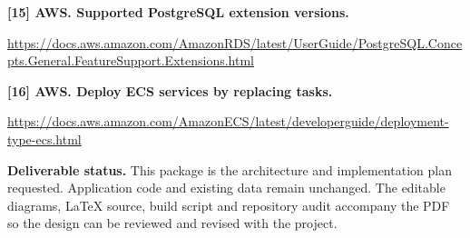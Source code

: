 \documentclass[10pt,letterpaper]{article}
\newcommand{\key}[1]{\textbf{\color{ink}#1}}
\newenvironment{decision}{\begin{tcolorbox}[colback=pale,colframe=teal,boxrule=0.5pt,arc=2pt,left=9pt,right=9pt,top=6pt,bottom=6pt]}{\end{tcolorbox}}
\begin{document}
\hypertarget{src15}{}\key{[15] AWS. Supported PostgreSQL extension versions.}\par
\url{https://docs.aws.amazon.com/AmazonRDS/latest/UserGuide/PostgreSQL.Concepts.General.FeatureSupport.Extensions.html}

\hypertarget{src16}{}\key{[16] AWS. Deploy ECS services by replacing tasks.}\par
\url{https://docs.aws.amazon.com/AmazonECS/latest/developerguide/deployment-type-ecs.html}

\vfill
\begin{decision}
\key{Deliverable status.} This package is the architecture and implementation plan requested. Application code and existing data remain unchanged. The editable diagrams, LaTeX source, build script and repository audit accompany the PDF so the design can be reviewed and revised with the project.
\end{decision}
\end{document}
